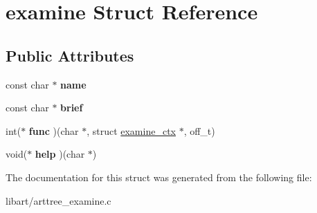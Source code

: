 \hypertarget{structexamine}{}\section{examine Struct Reference}
\label{structexamine}
\subsection*{Public Attributes}
\begin{DoxyCompactItemize}
\item 
\mbox{\label{structexamine_ae505057d5627be07305b251125bee3ee}} 
const char $\ast$ {\bfseries name}
\item 
\mbox{\label{structexamine_a67ca25732b457f0dd3aef7d33eaea243}} 
const char $\ast$ {\bfseries brief}
\item 
\mbox{\label{structexamine_a2acd23e70fd92a66bef62c02076f2095}} 
int($\ast$ {\bfseries func} )(char $\ast$, struct \hyperlink{structexamine__ctx}{examine\+\_\+ctx} $\ast$, off\+\_\+t)
\item 
\mbox{\label{structexamine_a755e6e20a4997cd7c1f568fabc56867c}} 
void($\ast$ {\bfseries help} )(char $\ast$)
\end{DoxyCompactItemize}


The documentation for this struct was generated from the following file\+:\begin{DoxyCompactItemize}
\item 
libart/arttree\+\_\+examine.\+c\end{DoxyCompactItemize}
